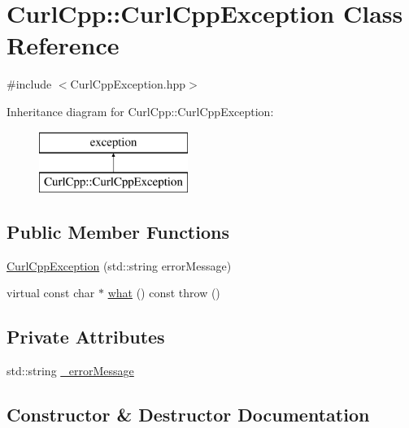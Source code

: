 \hypertarget{class_curl_cpp_1_1_curl_cpp_exception}{}\section{Curl\+Cpp\+:\+:Curl\+Cpp\+Exception Class Reference}
\label{class_curl_cpp_1_1_curl_cpp_exception}


{\ttfamily \#include $<$Curl\+Cpp\+Exception.\+hpp$>$}

Inheritance diagram for Curl\+Cpp\+:\+:Curl\+Cpp\+Exception\+:\begin{figure}[H]
\begin{center}
\leavevmode
\includegraphics[height=2.000000cm]{class_curl_cpp_1_1_curl_cpp_exception}
\end{center}
\end{figure}
\subsection*{Public Member Functions}
\begin{DoxyCompactItemize}
\item 
\hyperlink{class_curl_cpp_1_1_curl_cpp_exception_a0511de152c15c19174051a5b9045becf}{Curl\+Cpp\+Exception} (std\+::string error\+Message)
\item 
virtual const char $\ast$ \hyperlink{class_curl_cpp_1_1_curl_cpp_exception_a24b4be0db92a900b2779752d178f80c8}{what} () const   throw ()
\end{DoxyCompactItemize}
\subsection*{Private Attributes}
\begin{DoxyCompactItemize}
\item 
std\+::string \hyperlink{class_curl_cpp_1_1_curl_cpp_exception_a09d95a9e9d9f9cf400fb51784d22d0d2}{\+\_\+error\+Message}
\end{DoxyCompactItemize}


\subsection{Constructor \& Destructor Documentation}
\hypertarget{class_curl_cpp_1_1_curl_cpp_exception_a0511de152c15c19174051a5b9045becf}{}
